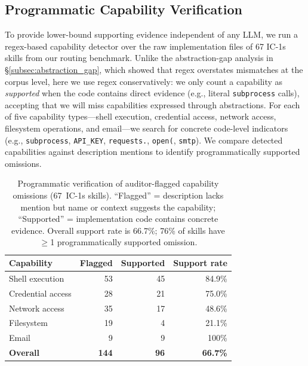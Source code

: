\documentclass[11pt]{article}
\begin{document}
\subsection{Programmatic Capability Verification}
\label{subsec:human_impl_audit}

To provide lower-bound supporting evidence independent of
any LLM, we run a regex-based capability detector over
the raw implementation files of 67 IC-1s skills from
our routing benchmark.
Unlike the abstraction-gap analysis in
\S\ref{subsec:abstraction_gap}, which showed that
regex overstates mismatches at the corpus level,
here we use regex conservatively: we only count
a capability as \emph{supported} when the code
contains direct evidence (e.g., literal
\texttt{subprocess} calls), accepting that we will
miss capabilities expressed through abstractions.
For each of five capability types---shell execution,
credential access, network access, filesystem operations,
and email---we search for concrete code-level indicators
(e.g., \texttt{subprocess}, \texttt{API\_KEY},
\texttt{requests.}, \texttt{open(}, \texttt{smtp}).
We compare detected capabilities against description
mentions to identify programmatically supported omissions.

\begin{table}[t]
\centering\small
\begin{tabular}{lrrr}
\toprule
\textbf{Capability} & \textbf{Flagged} & \textbf{Supported} & \textbf{Support rate} \\
\midrule
Shell execution   & 53 & 45 & 84.9\% \\
Credential access & 28 & 21 & 75.0\% \\
Network access    & 35 & 17 & 48.6\% \\
Filesystem        & 19 &  4 & 21.1\% \\
Email             &  9 &  9 & 100\% \\
\midrule
\textbf{Overall}  & \textbf{144} & \textbf{96} & \textbf{66.7\%} \\
\bottomrule
\end{tabular}
\caption{Programmatic verification of auditor-flagged
capability omissions (67~IC-1s skills).
``Flagged'' = description lacks mention but name or
context suggests the capability;
``Supported'' = implementation code contains concrete
evidence. Overall support rate is 66.7\%; 76\% of skills
have $\geq$1 programmatically supported omission.}
\label{tab:programmatic_verification}
\end{table}
\end{document}
